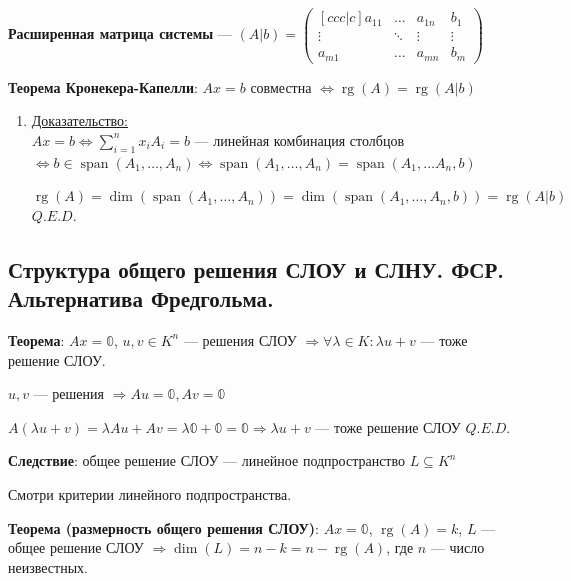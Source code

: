 \documentclass[twoside]{book}
\DeclareMathOperator{\rg}{rg}
\DeclareMathOperator{\spann}{span}
\newcommand{\prooff}[1]{{\underline{Доказательство:}} \\ }
\begin{document}
\textbf{Расширенная матрица системы} --- \((A | b) =
\begin{pmatrix}[ccc|c]
    a_{11} & \ldots & a_{1n} & b_1    \\
    \vdots & \ddots & \vdots & \vdots \\
    a_{m1} & \ldots & a_{mn} & b_m
\end{pmatrix}\)

\textbf{Теорема Кронекера-Капелли}: \(Ax = b\) совместна \(\Leftrightarrow \rg(A) = \rg(A|b)\)

\begin{enumerate}
    \item[] \prooff{}
          \(Ax = b \Leftrightarrow \sum\limits_{i=1}^n x_i A_i = b\) --- линейная комбинация столбцов \(\Leftrightarrow b \in \spann(A_1, \ldots, A_n) \Leftrightarrow \spann(A_1, \ldots, A_n) = \spann(A_1,\ldots A_n, b)\)

          \(\rg(A) = \dim(\spann(A_1,\ldots, A_n)) = \dim(\spann(A_1, \ldots, A_n, b)) = \rg(A | b)\) \(Q.E.D.\)

\end{enumerate}


\subsection{Структура общего решения СЛОУ и СЛНУ. ФСР. Альтернатива Фредгольма.}

\textbf{Теорема}: \(Ax = \mathbb{0}\), \(u,v \in K^n\) --- решения СЛОУ \(\Rightarrow \forall \lambda \in K: \lambda u + v\) --- тоже решение СЛОУ.

\(u, v\) --- решения \(\Rightarrow Au = \mathbb{0}, Av = \mathbb{0}\)

\(A(\lambda u + v) = \lambda Au + Av = \lambda \mathbb{0} + \mathbb{0} = \mathbb{0} \Rightarrow \lambda u + v\) --- тоже решение СЛОУ \(Q.E.D.\)

\textbf{Следствие}: общее решение СЛОУ --- линейное подпространство \(L \subseteq K^n\)

Смотри критерии линейного подпространства.

\textbf{Теорема (размерность общего  решения СЛОУ)}: \(Ax = \mathbb{0}\), \(\rg(A) = k\), \(L\) --- общее решение СЛОУ \(\Rightarrow \dim(L) = n - k = n - \rg(A)\), где \(n\) --- число неизвестных.
\end{document}
